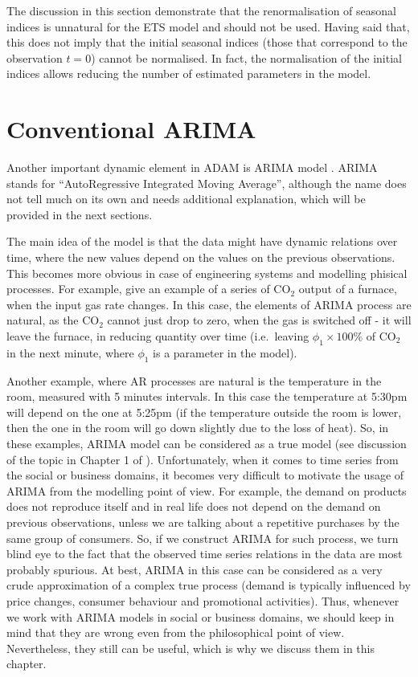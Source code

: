 \documentclass[
]{book}
\theoremstyle{definition}
\theoremstyle{definition}
\theoremstyle{definition}
\theoremstyle{definition}
\theoremstyle{remark}
\begin{document}
The discussion in this section demonstrate that the renormalisation of seasonal indices is unnatural for the ETS model and should not be used. Having said that, this does not imply that the initial seasonal indices (those that correspond to the observation \(t=0\)) cannot be normalised. In fact, the normalisation of the initial indices allows reducing the number of estimated parameters in the model.

\hypertarget{ARIMA}{%
\chapter{Conventional ARIMA}\label{ARIMA}}

Another important dynamic element in ADAM is ARIMA model \citep[developed originally by][]{Box1976}. ARIMA stands for ``AutoRegressive Integrated Moving Average'', although the name does not tell much on its own and needs additional explanation, which will be provided in the next sections.

The main idea of the model is that the data might have dynamic relations over time, where the new values depend on the values on the previous observations. This becomes more obvious in case of engineering systems and modelling phisical processes. For example, \citet{Box1976} give an example of a series of CO\(_2\) output of a furnace, when the input gas rate changes. In this case, the elements of ARIMA process are natural, as the CO\(_2\) cannot just drop to zero, when the gas is switched off - it will leave the furnace, in reducing quantity over time (i.e.~leaving \(\phi_1\times100\%\) of CO\(_2\) in the next minute, where \(\phi_1\) is a parameter in the model).

Another example, where AR processes are natural is the temperature in the room, measured with 5 minutes intervals. In this case the temperature at 5:30pm will depend on the one at 5:25pm (if the temperature outside the room is lower, then the one in the room will go down slightly due to the loss of heat). So, in these examples, ARIMA model can be considered as a true model (see discussion of the topic in Chapter 1 of \citet{SvetunkovSBA}). Unfortunately, when it comes to time series from the social or business domains, it becomes very difficult to motivate the usage of ARIMA from the modelling point of view. For example, the demand on products does not reproduce itself and in real life does not depend on the demand on previous observations, unless we are talking about a repetitive purchases by the same group of consumers. So, if we construct ARIMA for such process, we turn blind eye to the fact that the observed time series relations in the data are most probably spurious. At best, ARIMA in this case can be considered as a very crude approximation of a complex true process (demand is typically influenced by price changes, consumer behaviour and promotional activities). Thus, whenever we work with ARIMA models in social or business domains, we should keep in mind that they are wrong even from the philosophical point of view. Nevertheless, they still can be useful, which is why we discuss them in this chapter.
\end{document}
